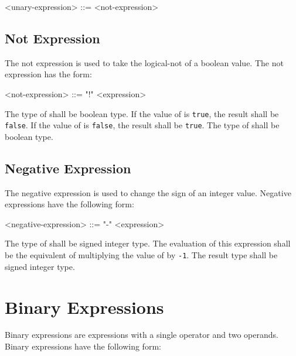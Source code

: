\begin{minip}
\begin{grammar}
<unary-expression> ::= 
<not-expression>
\end{grammar}
\end{minip}

\subsection{Not Expression} \label{guide:not_expr}

The not expression is used to take the logical-not of a boolean value. The not expression has the form: 

\begin{minip}
\begin{grammar}
<not-expression> ::= "!" <expression> 
\end{grammar}
\end{minip}

The type of  shall be boolean type. If the value of  is \texttt{true}, the result shall be \texttt{false}. If the value of  is \texttt{false}, the result shall be \texttt{true}. The type of  shall be boolean type.

\subsection{Negative Expression} \label{neg_expr_guide}

The negative expression is used to change the sign of an integer value. Negative expressions have the following form:

\begin{minip}
\begin{grammar}
<negative-expression> ::= "-" <expression>
\end{grammar}
\end{minip}

The type of  shall be signed integer type. The evaluation of this expression shall be the equivalent of multiplying the value of  by \texttt{-1}. The result type shall be signed integer type.

\section{Binary Expressions} \label{guide:binary_expr}

Binary expressions are expressions with a single operator and two operands. Binary expressions have the following form:

